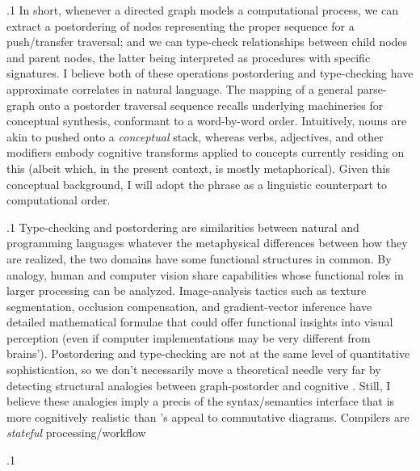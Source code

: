 \documentclass[11pt, twocolumn]{article}
\begin{document}
{{\p.1{%
In short, whenever a directed graph models a computational
process, we can extract a postordering of nodes
representing the proper sequence for a push/transfer traversal;
and we can type-check relationships between
child nodes and parent nodes, the latter being interpreted
as procedures with specific signatures. I believe
both of these operations \mdash{} postordering and type-checking
\mdash{} have approximate correlates in natural language.
The mapping of a general parse-graph onto
a postorder traversal sequence recalls
underlying machineries for conceptual synthesis,
conformant to a word-by-word  order.
Intuitively, nouns are akin to
 pushed onto a \textit{conceptual} stack,
whereas verbs, adjectives, and other modifiers
embody cognitive transforms applied to concepts
currently residing on this 
(albeit which, in the present context, is mostly metaphorical).
Given this conceptual background, I will adopt the
phrase  as a linguistic
counterpart to computational  order.
}%

\p.1{%
Type-checking and postordering are 
similarities between natural and programming languages
\mdash{} whatever the metaphysical differences between how
they are realized, the two domains have some
functional structures in common. By analogy,
human and computer vision share capabilities
whose functional roles in larger processing 
can be analyzed. Image-analysis tactics such as texture
segmentation, occlusion compensation, and gradient-vector inference
have detailed mathematical formulae that could offer functional insights into
visual perception (even if computer implementations may
be very different from brains'). Postordering and type-checking are
not at the same level of quantitative sophistication,
so we don't necessarily move a theoretical needle very far
by detecting structural analogies between graph-postorder
and cognitive . Still,
I believe these analogies imply a precis of the
syntax/semantics interface that is more cognitively realistic
than \Boltetal{}'s appeal to commutative diagrams. Compilers
are \textit{stateful} processing/workflow \textcolor{white}{platforms,
more than term-reduce artefacts.}
}%

\pa.1{%
\upAdj{1.8em}
\noindent{}\upAdj{1em}
}%

}}
\end{document}
